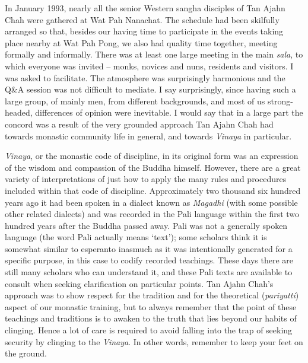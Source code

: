 \enlargethispage{\baselineskip}

In January 1993, nearly all the senior Western sangha disciples of Tan
Ajahn Chah were gathered at Wat Pah Nanachat. The schedule had been
skilfully arranged so that, besides our having time to participate in
the events taking place nearby at Wat Pah Pong, we also had quality time
together, meeting formally and informally. There was at least one large
meeting in the main \emph{sala}, to which everyone was invited -- monks,
novices and nuns, residents and visitors. I was asked to facilitate. The
atmosphere was surprisingly harmonious and the Q\&A session was not
difficult to mediate. I say surprisingly, since having such a large
group, of mainly men, from different backgrounds, and most of us
strong-headed, differences of opinion were inevitable. I would say that
in a large part the concord was a result of the very grounded
approach Tan Ajahn Chah had towards monastic community life in general,
and towards \emph{Vinaya} in particular.

\enlargethispage{\baselineskip}

\emph{Vinaya}, or the monastic code of discipline, in its original form
was an expression of the wisdom and compassion of the Buddha himself.
However, there are a great variety of interpretations of just how to
apply the many rules and procedures included within that code of
discipline. Approximately two thousand six hundred years ago it had been
spoken in a dialect known as \emph{Magadhi} (with some possible other
related dialects) and was recorded in the Pali language within the first
two hundred years after the Buddha passed away. Pali was not a generally
spoken language (the word Pali actually means `text'); some scholars
think it is somewhat similar to esperanto\cite{esperanto}
inasmuch as it was intentionally generated for a specific
purpose, in this case to codify recorded teachings. These days there are
still many scholars who can understand it, and these Pali texts are
available to consult when seeking clarification on particular points.
Tan Ajahn Chah's approach was to show respect for the tradition and for
the theoretical (\emph{pariyatti}) aspect of our monastic training, but
to always remember that the point of these teachings and traditions is
to awaken to the truth that lies beyond our habits of clinging. Hence a
lot of care is required to avoid falling into the trap of seeking
security by clinging to the \emph{Vinaya}. In other words, remember to
keep your feet on the ground.

